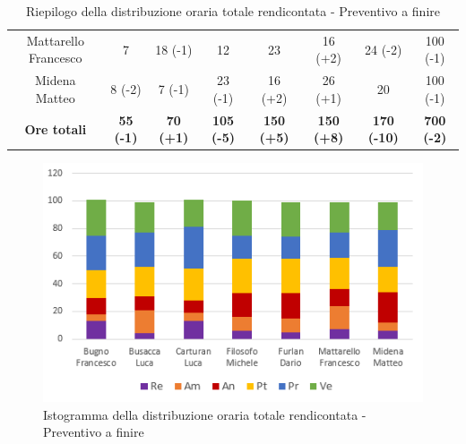 \begin{table}[H]
\begin{tabular}{c|c|c|c|c|c|c|c}
    Mattarello Francesco & 7                                                             & 18 (-1)          & 12                & 23                & 16 (+2)           & 24 (-2)            & 100 (-1)          \\
    Midena Matteo        & 8 (-2)                                                        & 7 (-1)           & 23 (-1)           & 16 (+2)           & 26 (+1)           & 20                 & 100 (-1)          \\
    \textbf{Ore totali}  & \textbf{55 (-1)}                                              & \textbf{70 (+1)} & \textbf{105 (-5)} & \textbf{150 (+5)} & \textbf{150 (+8)} & \textbf{170 (-10)} & \textbf{700 (-2)}
  \end{tabular}
  \caption{Riepilogo della distribuzione oraria totale rendicontata - Preventivo a finire}
\end{table}

\begin{figure}[H]
  \centering
  \includegraphics[scale=0.9]{immagini/ore_lavoro_preventivo_finire.png}
  \caption{Istogramma della distribuzione oraria totale rendicontata - Preventivo a finire}
\end{figure}


